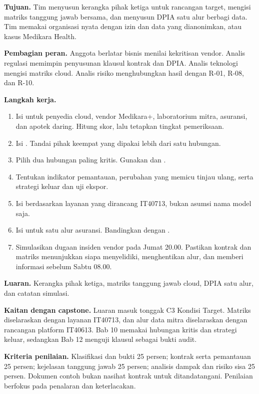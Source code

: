 \textbf{Tujuan.} Tim menyusun kerangka pihak ketiga untuk rancangan target, mengisi matriks tanggung
jawab bersama, dan menyusun DPIA satu alur berbagi data. Tim memakai organisasi nyata dengan izin
dan data yang dianonimkan, atau kasus Medikara Health.

\textbf{Pembagian peran.} Anggota berlatar bisnis menilai kekritisan vendor. Analis regulasi
memimpin penyusunan klausul kontrak dan DPIA. Analis teknologi mengisi matriks cloud. Analis risiko
menghubungkan hasil dengan R-01, R-08, dan R-10.

\textbf{Langkah kerja.}
\begin{enumerate}
  \item Isi  untuk penyedia cloud, vendor
  Medikara+, laboratorium mitra, asuransi, dan apotek daring. Hitung skor, lalu tetapkan tingkat
  pemeriksaan.
  \item Isi . Tandai pihak keempat yang dipakai
  lebih dari satu hubungan.
  \item Pilih dua hubungan paling kritis. Gunakan 
  dan .
  \item Tentukan indikator pemantauan, perubahan yang memicu tinjau ulang, serta strategi keluar dan
  uji ekspor.
  \item Isi  berdasarkan layanan yang dirancang IT40713,
  bukan asumsi nama model saja.
  \item Isi  untuk satu alur asuransi. Bandingkan dengan
  .
  \item Simulasikan dugaan insiden vendor pada Jumat 20.00. Pastikan kontrak dan matriks menunjukkan
  siapa menyelidiki, menghentikan alur, dan memberi informasi sebelum Sabtu 08.00.
\end{enumerate}

\textbf{Luaran.} Kerangka pihak ketiga, matriks tanggung jawab cloud, DPIA satu alur, dan catatan
simulasi.

\textbf{Kaitan dengan capstone.} Luaran masuk tonggak C3 Kondisi Target. Matriks diselaraskan dengan
layanan IT40713, dan alur data mitra diselaraskan dengan rancangan platform IT40613. Bab 10 memakai
hubungan kritis dan strategi keluar, sedangkan Bab 12 menguji klausul sebagai bukti audit.

\textbf{Kriteria penilaian.} Klasifikasi dan bukti 25 persen; kontrak serta pemantauan 25 persen;
kejelasan tanggung jawab 25 persen; analisis dampak dan risiko sisa 25 persen. Dokumen contoh bukan
nasihat kontrak untuk ditandatangani. Penilaian berfokus pada penalaran dan keterlacakan.

